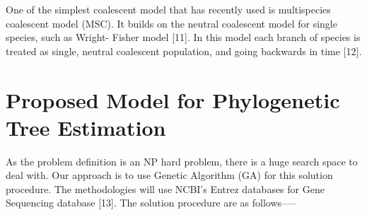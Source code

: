 \documentclass[preprint,12pt]{elsarticle}
\begin{document}
One of the simplest coalescent model that has recently used is multispecies coalescent model (MSC). It builds on the neutral coalescent model for single species, such as Wright- Fisher model [11]. In this model each branch of species is treated as single, neutral coalescent population, and going backwards in time [12].



\section{Proposed Model for Phylogenetic Tree Estimation}

\label{S:3}
As the problem definition is an NP hard problem, there is a huge search space to deal with. Our approach is to use Genetic Algorithm (GA) for this solution procedure. The methodologies will use NCBI's Entrez databases for Gene Sequencing database [13]. The solution procedure are as follows—--
\end{document}
